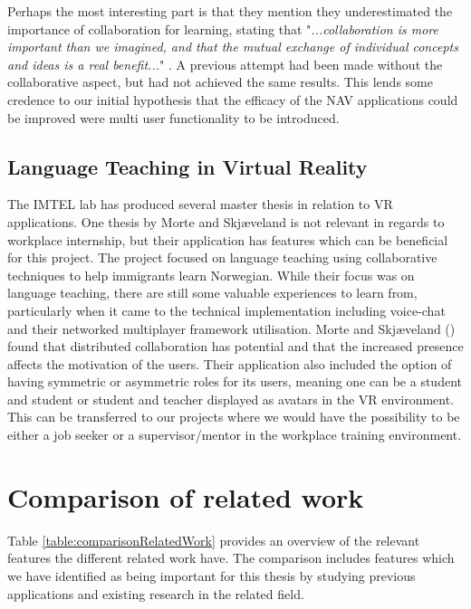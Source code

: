 Perhaps the most interesting part is that they mention they underestimated the importance of collaboration for learning, stating that "\textit{...collaboration is more important than we imagined, and that the mutual exchange of individual concepts and ideas is a real benefit...}" \cite{kockro2007collaborative}. A previous attempt had been made without the collaborative aspect, but had not achieved the same results. This lends some credence to our initial hypothesis that the efficacy of the NAV applications could be improved were multi user functionality to be introduced. 

\subsection{Language Teaching in Virtual Reality}
The IMTEL lab has produced several master thesis in relation to VR applications. One thesis by  Morte and Skjæveland \cite{morte2019effects} is not relevant in regards to workplace internship, but their application has features which can be beneficial for this project. The project focused on language teaching using collaborative techniques to help immigrants learn Norwegian. While their focus was on language teaching, there are still some valuable experiences to learn from, particularly when it came to the technical implementation including voice-chat and their networked multiplayer framework utilisation. Morte and Skjæveland (\citeyear{morte2019effects}) found that distributed collaboration has potential and that the increased presence affects the motivation of the users. Their application also included the option of having symmetric or asymmetric roles for its users, meaning one can be a student and student or student and teacher displayed as avatars in the VR environment. This can be transferred to our projects where we would have the possibility to be either a job seeker or a supervisor/mentor in the workplace training environment.     

\section{Comparison of related work}
\label{section:comparisonRelatedWork}
Table \ref{table:comparisonRelatedWork} provides an overview of the relevant features the different related work have. The comparison includes features which we have identified as being important for this thesis by studying previous applications and existing research in the related field. 

